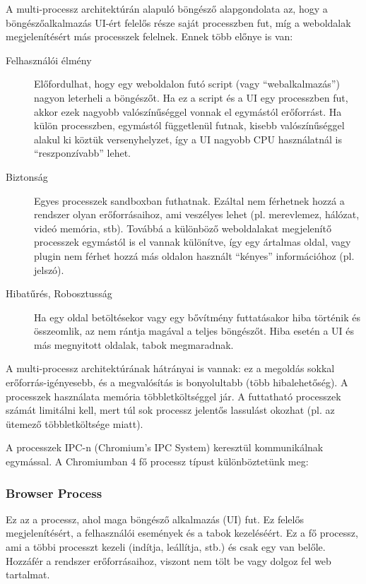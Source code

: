 \documentclass[12pt]{report}
\begin{document}
A multi-processz architektúrán alapuló böngésző alapgondolata az, hogy a böngészőalkalmazás
UI-ért felelős része saját processzben fut, míg a weboldalak megjelenítésért más
processzek felelnek. Ennek több előnye is van: \cite{bib:chromium-blog-multi-process}
\begin{description}
    \item[Felhasználói élmény]
        Előfordulhat, hogy egy weboldalon futó script (vagy ``webalkalmazás'')
        nagyon leterheli a böngészőt. Ha ez a script és a UI egy processzben fut,
        akkor ezek nagyobb valószínűséggel vonnak el egymástól erőforrást. Ha külön
        processzben, egymástól függetlenül futnak, kisebb valószínűséggel alakul ki
        köztük versenyhelyzet, így a UI nagyobb CPU használatnál is ``reszponzívabb''
        lehet.
    \item[Biztonság]
        Egyes processzek sandboxban futhatnak. Ezáltal nem férhetnek hozzá a rendszer
        olyan erőforrásaihoz, ami veszélyes lehet (pl. merevlemez, hálózat,
        videó memória, stb).
        Továbbá a különböző weboldalakat megjelenítő processzek egymástól is el vannak
        különítve, így egy ártalmas oldal, vagy plugin nem férhet hozzá más oldalon használt
        ``kényes'' információhoz (pl. jelszó).
    \item[Hibatűrés, Robosztusság]
        Ha egy oldal betöltésekor vagy egy bővítmény futtatásakor hiba történik és
        összeomlik, az nem rántja magával a teljes böngészőt. Hiba esetén a UI és más
        megnyitott oldalak, tabok megmaradnak.
\end{description}

A multi-processz architektúrának hátrányai is vannak: ez a megoldás sokkal \\
erőforrás-igényesebb, és a megvalósítás is bonyolultabb (több hibalehetőség).
A processzek használata memória többletköltséggel jár. A futtatható processzek
számát limitálni kell, mert túl sok processz jelentős lassulást okozhat (pl. az ütemező
többletköltsége miatt).

A processzek IPC-n (Chromium's IPC System) keresztül kommunikálnak egymással.
A Chromiumban 4 fő processz típust különböztetünk meg:

\subsubsection{Browser Process}
Ez az a processz, ahol maga böngésző alkalmazás (UI) fut. Ez felelős megjelenítésért,
a felhasználói események és a tabok kezeléséért. Ez a fő processz, ami a többi processzt
kezeli (indítja, leállítja, stb.) és csak egy van belőle. Hozzáfér a rendszer erőforrásaihoz,
viszont nem tölt be vagy dolgoz fel web tartalmat.
\end{document}
